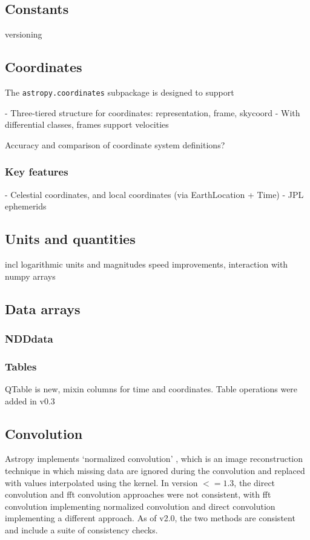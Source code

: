 \documentclass[modern]{aastex61}
\begin{document}
\subsection{Constants}
versioning

\subsection{Coordinates}

The \texttt{astropy.coordinates} subpackage is designed to support

- Three-tiered structure for coordinates: representation, frame, skycoord
- With differential classes, frames support velocities

Accuracy and comparison of coordinate system definitions?

\subsubsection{Key features}

- Celestial coordinates, and local coordinates (via EarthLocation + Time)
- JPL ephemerids

\subsection{Units and quantities}

incl logarithmic units and magnitudes
speed improvements,
interaction with numpy arrays

\subsection{Data arrays}

\subsubsection{NDDdata}

\subsubsection{Tables}
QTable is new, mixin columns for time and coordinates. Table operations were added in v0.3

\subsection{Convolution}
Astropy implements `normalized convolution' \citep[e.g.,][]{Knutsson1993}, which is an image reconstruction technique in which missing data are ignored during the convolution and replaced with values interpolated using the kernel.   In version $<=1.3$, the direct convolution and fft convolution approaches were not consistent, with fft convolution implementing normalized convolution and direct convolution implementing a different approach.  As of v2.0, the two methods are consistent and include a suite of consistency checks.
\end{document}
